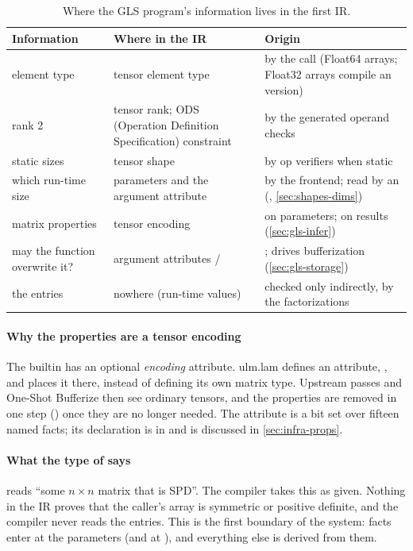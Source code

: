 \begin{table}[t]
\centering\small
\begin{tabularx}{\linewidth}{@{}P{3.3cm}P{4.4cm}L@{}}
\toprule
\textbf{Information} & \textbf{Where in the IR} & \textbf{Origin} \\
\midrule
element type  & tensor element type & \Odecl{} by the call
  (Float64 arrays; Float32 arrays compile an  version) \\
rank 2 & tensor rank; ODS (Operation Definition Specification) constraint  & \Over{}
  by the generated operand checks \\
static sizes & tensor shape & \Over{} by op verifiers when static \\
which run-time size &  parameters and the argument attribute
   & \Odecl{} by the frontend; read by an \Oana{}
  (, \cref{sec:shapes-dims}) \\
matrix properties & tensor encoding  & \Odecl{} on
  parameters; \Oinf{} on results (\cref{sec:gls-infer}) \\
may the function overwrite it? & argument attributes  /
   & \Odecl{}; drives bufferization
  (\cref{sec:gls-storage}) \\
the entries & nowhere (run-time values) & checked only indirectly, by the
  factorizations \Orun{} \\
\bottomrule
\end{tabularx}
\caption{Where the GLS program's information lives in the first IR.}
\label{tab:gls-info}
\end{table}

\paragraph{Why the properties are a tensor encoding} The builtin
 has an optional \emph{encoding} attribute. ulm.lam
defines an attribute, , and places it there,
instead of defining its own matrix type. Upstream passes and One-Shot
Bufferize then see ordinary tensors, and the properties are removed in one
step () once they are no longer needed. The
attribute is a bit set over fifteen named facts; its declaration is in
 and is discussed in
\cref{sec:infra-props}.

\paragraph{What the type of  says}  reads ``some \(n\times n\) matrix that is SPD''. The
compiler takes this as given. Nothing in the IR proves that the caller's
array is symmetric or positive definite, and the compiler never reads the
entries. This is the first boundary of the system: \Odecl{} facts enter at
the parameters (and at ), and everything else is
derived from them.


